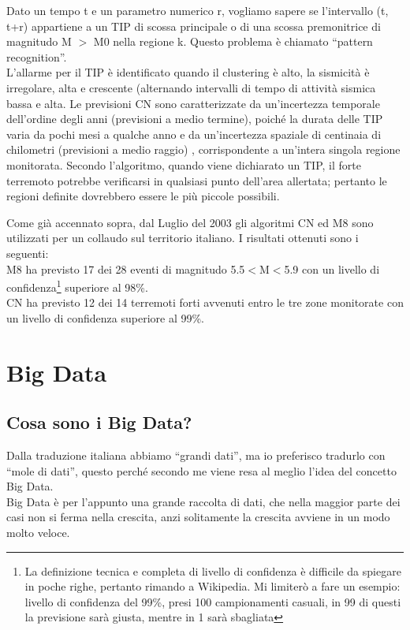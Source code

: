 \begin{itemize}
Dato un tempo t e un parametro numerico r, vogliamo sapere se l'intervallo (t, t+r) appartiene a un TIP di scossa principale o di una scossa premonitrice di magnitudo M $>$ M0 nella regione k.
Questo problema \`e chiamato ``pattern recognition''. \cite{TipsCN}\\
L'allarme per il TIP \`e identificato quando il clustering \`e alto, la sismicit\`a \`e irregolare, alta e crescente (alternando intervalli di tempo di attivit\`a sismica bassa e alta. Le previsioni CN sono caratterizzate da un'incertezza temporale dell'ordine degli anni (previsioni a medio termine), poich\'e la durata delle TIP varia da pochi mesi a qualche anno e da un'incertezza spaziale di centinaia di chilometri (previsioni a medio raggio) , corrispondente a un'intera singola regione monitorata. Secondo l'algoritmo, quando viene dichiarato un TIP, il forte terremoto potrebbe verificarsi in qualsiasi punto dell'area allertata; pertanto le regioni definite dovrebbero essere le pi\`u piccole possibili. \cite{algortimoCN}
\end{itemize}
Come gi\`a accennato sopra, dal Luglio del 2003 gli algoritmi CN ed M8 sono utilizzati per un collaudo sul territorio italiano. I risultati ottenuti sono i seguenti:\\
M8 ha previsto 17 dei 28 eventi di magnitudo 5.5$<$M$<$5.9 con un livello di confidenza\footnote{La definizione tecnica e completa di livello di confidenza \`e difficile da spiegare in poche righe, pertanto rimando a Wikipedia. Mi limiter\`o a fare un esempio: livello di confidenza del 99\%, presi 100 campionamenti casuali, in 99 di questi la previsione sar\`a giusta, mentre in 1 sar\`a sbagliata} superiore al 98\%.\\
CN ha previsto 12 dei 14 terremoti forti avvenuti entro le tre zone monitorate con un livello di confidenza superiore al 99\%. \cite{GiulianoFPanza}

\section{Big Data}\label{bigData}

\subsection{Cosa sono i Big Data?}
Dalla traduzione italiana abbiamo ``grandi dati'', ma io preferisco tradurlo con ``mole di dati'', questo perch\'e secondo me viene resa al meglio l'idea del concetto Big Data.\\
Big Data \`e per l'appunto una grande raccolta di dati, che nella maggior parte dei casi non si ferma nella crescita, anzi solitamente la crescita avviene in un modo molto veloce.

